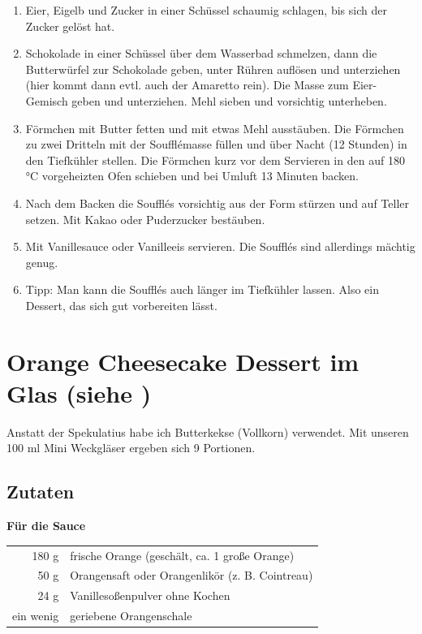 \begin{enumerate}
	\item Eier, Eigelb und Zucker in einer Schüssel schaumig schlagen, bis sich der Zucker gelöst hat. 
	\item Schokolade in einer Schüssel über dem Wasserbad schmelzen, dann die Butterwürfel zur Schokolade geben, unter Rühren auflösen und unterziehen (hier kommt dann evtl. auch der Amaretto rein). Die Masse zum Eier-Gemisch geben und unterziehen. Mehl sieben und vorsichtig unterheben.
	\item Förmchen mit Butter fetten und mit etwas Mehl ausstäuben. Die Förmchen zu zwei Dritteln mit der Soufflémasse füllen und über Nacht (12 Stunden) in den Tiefkühler stellen. Die Förmchen kurz vor dem Servieren in den auf 180 °C vorgeheizten Ofen schieben und bei Umluft 13 Minuten backen.
	\item Nach dem Backen die Soufflés vorsichtig aus der Form stürzen und auf Teller setzen. Mit Kakao oder Puderzucker bestäuben.
	\item Mit Vanillesauce oder Vanilleeis servieren. Die Soufflés sind allerdings mächtig genug.
	\item Tipp: Man kann die Soufflés auch länger im Tiefkühler lassen. Also ein Dessert, das sich gut vorbereiten lässt.
\end{enumerate}


\section[Orange Cheesecake Dessert]{Orange Cheesecake Dessert im Glas \textmd{(siehe \cite{sonjaOrangeCheesecake})}} 
    Anstatt der Spekulatius habe ich Butterkekse (Vollkorn) verwendet. Mit unseren 100 ml Mini Weckgläser ergeben sich 9 Portionen.
    
    \subsection*{Zutaten}
    \textbf{Für die Sauce} \\
    \begin{tabular}{r l}
            180 g & frische Orange (geschält, ca. 1 große Orange)   \\
             50 g & Orangensaft oder Orangenlikör (z. B. Cointreau) \\
             24 g & Vanillesoßenpulver ohne Kochen                  \\
        ein wenig & geriebene Orangenschale
    \end{tabular}
    
